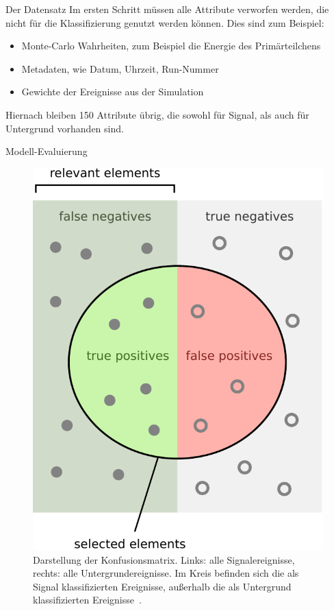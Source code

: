 \documentclass[t]{beamer}
\begin{document}
\begin{columns}[onlytextwidth]
\begin{column}{0.5\textwidth}
\begin{block}{Der Datensatz}
      Im ersten Schritt müssen alle Attribute verworfen werden, die nicht für
      die Klassifizierung genutzt werden können.
      Dies sind zum Beispiel:
      \begin{itemize}
        \item Monte-Carlo Wahrheiten, zum Beispiel die Energie des Primärteilchens
        \item Metadaten, wie Datum, Uhrzeit, Run-Nummer
        \item Gewichte der Ereignisse aus der Simulation
      \end{itemize}

      Hiernach bleiben 150 Attribute übrig, die sowohl für Signal, als auch für
      Untergrund vorhanden sind.
      \end{block}

      \begin{block}{Modell-Evaluierung}
        \begin{multicols}{2}
          \begin{figure}
            \centering
            \includegraphics[width=0.9\linewidth]{images/precisionrecall-crop.pdf}
            \caption{Darstellung der Konfusionsmatrix. Links: alle Signalereignisse,
            rechts: alle Untergrundereignisse. Im Kreis befinden sich die als Signal klassifizierten Ereignisse,
            außerhalb die als Untergrund klassifizierten Ereignisse~\cite{recall_precission_pic}.}
          \end{figure}
          \columnbreak


\end{multicols}
\end{block}
\end{column}
\end{columns}
\end{document}
